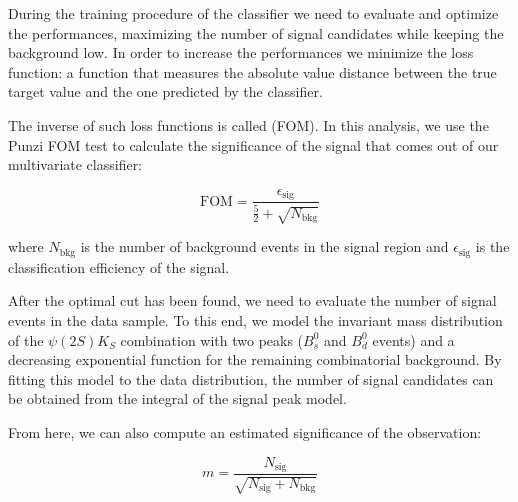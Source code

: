 During the training procedure of the classifier we need to evaluate and optimize the performances, maximizing the number of signal candidates while keeping the background low.
In order to increase the performances we minimize the loss function: a function that measures the absolute value distance between the true target value and the one predicted by the classifier.

The inverse of such loss functions is called  (FOM). In this analysis, we use the Punzi FOM test to calculate the significance of the signal that comes out of our multivariate classifier:

\begin{equation}
    \text{FOM}=\frac{\epsilon_{\text{sig}}}{\frac{5}{2}+\sqrt{N_{\text{bkg}}}}
    \label{eq:punzi}
\end{equation}

where $N_{\text{bkg}}$ is the number of background events in the signal region and $\epsilon_{\text{sig}}$ is the classification efficiency of the signal.

After the optimal cut has been found, we need to evaluate the number of signal events in the data sample. To this end, we model the invariant mass distribution of the $\psi(2S)K_{S}$ combination with two peaks ($B_s^0$ and $B_d^0$ events) and a decreasing exponential function
for the remaining combinatorial background. By fitting this model to the data distribution, the number of signal candidates can be obtained from the integral of the signal peak model.

From here, we can also compute an estimated significance of the observation:

\begin{equation}
    m=\frac{N_{\text{sig}}}{\sqrt{N_{\text{sig}}+N_{\text{bkg}}}}
    \label{eq:sig}
\end{equation}
